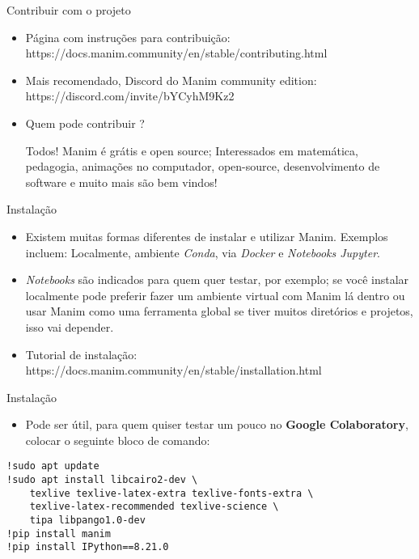 \documentclass[14pt, aspectratio=169]{beamer}
\begin{document}
\begin{frame}{Contribuir com o projeto}
\begin{itemize}
    \item<1->     Página com instruções para contribuição: https://docs.manim.community/en/stable/contributing.html

    \item<2-> 
    Mais recomendado, Discord do Manim community edition: https://discord.com/invite/bYCyhM9Kz2

    \item<3-> Quem pode contribuir ?

    Todos! Manim é grátis e open source; Interessados em matemática, pedagogia, animações no computador, open-source, desenvolvimento de software e muito mais são bem vindos!
\end{itemize}
\end{frame}

\begin{frame}{Instalação}
\begin{itemize}
    \item<1->     Existem muitas formas diferentes de instalar e utilizar Manim. Exemplos incluem: Localmente, ambiente \textit{Conda}, via \textit{Docker} e \textit{Notebooks Jupyter}.
    \item<2-> \textit{Notebooks} são indicados para quem quer testar, por exemplo; se você instalar localmente pode preferir fazer um ambiente virtual com Manim lá dentro ou usar Manim como uma ferramenta global se tiver muitos diretórios e projetos, isso vai depender.
    \item<3-> Tutorial de instalação: https://docs.manim.community/en/stable/installation.html
\end{itemize}
\end{frame}

\begin{frame}[fragile]{Instalação}
    \begin{itemize}
        \item Pode ser útil, para quem quiser testar um pouco no \textbf{Google Colaboratory}, colocar o seguinte bloco de comando:
    \end{itemize}
    \vspace{0.5em}
    \begin{verbatim}
!sudo apt update
!sudo apt install libcairo2-dev \
    texlive texlive-latex-extra texlive-fonts-extra \
    texlive-latex-recommended texlive-science \
    tipa libpango1.0-dev
!pip install manim
!pip install IPython==8.21.0
    \end{verbatim}
\end{frame}
\end{document}
